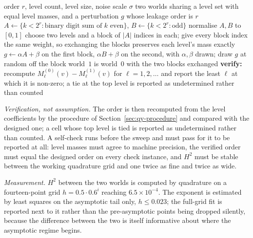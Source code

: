 \begin{algorithm}[htbp]
\caption{An instance with a designed leakage order $r$}
\label{alg:qy-instance}
\begin{algorithmic}[1]
\REQUIRE order $r$, level count, level size, noise scale $\sigma$
\ENSURE two worlds sharing a level set with equal level masses, and a perturbation $g$ whose
        leakage order is $r$
\STATE $A\leftarrow\{k<2^{r}:\text{binary digit sum of }k\text{ even}\}$,
       $B\leftarrow\{k<2^{r}:\text{odd}\}$
\STATE normalise $A,B$ to $[0,1]$ 
\STATE choose two levels and a block of $|A|$ indices in each; give every block index the
       same weight, so exchanging the blocks preserves each level's mass exactly
\STATE $g\leftarrow\alpha A+\beta$ on the first block, $\alpha B+\beta$ on the second, with
       $\alpha,\beta$ drawn; draw $g$ at random off the block
\STATE world~$1$ is world~$0$ with the two blocks exchanged
\STATE \textbf{verify:} recompute $M^{(0)}_{\ell}(v)-M^{(1)}_{\ell}(v)$ for
       $\ell=1,2,\dots$ and report the least $\ell$ at which it is non-zero; a tie at the top
       level is reported as undetermined rather than counted
\end{algorithmic}
\end{algorithm}

\emph{Verification, not assumption.} The order is then recomputed from the level coefficients
by the procedure of Section~\ref{sec:qy-procedure} and compared with the designed one; a cell
whose top level is tied is reported as undetermined rather than counted. A self-check runs
before the sweep and must pass for it to be reported at all: level masses must agree to
machine precision, the verified order must equal the designed order on every check instance,
and $H^{2}$ must be stable between the working quadrature grid and one twice as fine and
twice as wide.

\emph{Measurement.} $H^{2}$ between the two worlds is computed by quadrature on a
fourteen-point grid $h=0.5\cdot0.6^{i}$ reaching $6.5\times10^{-4}$. The exponent is
estimated by least squares on the asymptotic tail only, $h\le0.023$; the full-grid fit is
reported next to it rather than the pre-asymptotic points being dropped silently, because the
difference between the two is itself informative about where the asymptotic regime begins.

